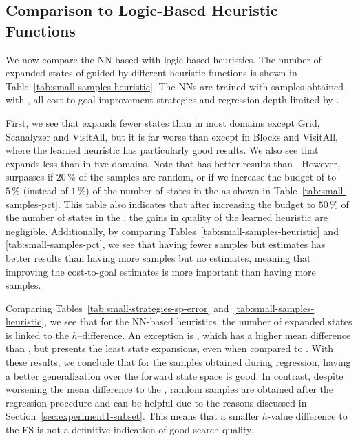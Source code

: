 \subsection{Comparison to Logic-Based Heuristic Functions}

We now compare the NN-based \hnn with logic-based heuristics. The number of expanded states of \gbfs guided by different heuristic functions is shown in Table~\ref{tab:small-samples-heuristic}. The NNs are trained with samples obtained with \bfsrw, all cost-to-goal improvement strategies and regression depth limited by \meanfx.  

First, we see that \hnnbase expands fewer states than \hgc in most domains except Grid, Scanalyzer and VisitAll, but it is far worse than \hff except in Blocks and VisitAll, where the learned heuristic has particularly good results. We also see that \hnnbfsrwl{\meanfx} expands less than \hnnbase in five domains. Note that \hff has better results than \hnnbfsrwl{\meanfx}. However, \hnnbfsrwl{\meanfx} surpasses \hff if $20\,\%$ of the samples are random, or if we increase the budget of \hnnbfsrwl{\meanfx} to $5\,\%$ (instead of $1\,\%$) of the number of states in the \fssp as shown in Table~\ref{tab:small-samples-pct}. This table also indicates that after increasing the budget to $50\,\%$ of the number of states in the \fssp, the gains in quality of the learned heuristic are negligible. Additionally, by comparing Tables~\ref{tab:small-samples-heuristic} and \ref{tab:small-samples-pct}, we see that having fewer samples but \hstar estimates has better results than having more samples but no \hstar estimates, meaning that improving the cost-to-goal estimates is more important than having more samples.%

Comparing Tables~\ref{tab:small-strategies-sp-error} and~\ref{tab:small-samples-heuristic}, we see that for the NN-based heuristics, the number of expanded states is linked to the $h$--\hstar difference. An exception is \hnnrs, which has a higher mean difference than \hnnbfsrwl{\meanfx}, but presents the least state expansions, even when compared to \hff. With these results, we conclude that for the samples obtained during regression, having a better generalization over the forward state space is good. In contrast, despite worsening the mean difference to the \fssp, random samples are obtained after the regression procedure and can be helpful due to the reasons discussed in Section~\ref{sec:experiment1-subset}. This means that a smaller $h$-value difference to the FS is not a definitive indication of good search quality.


